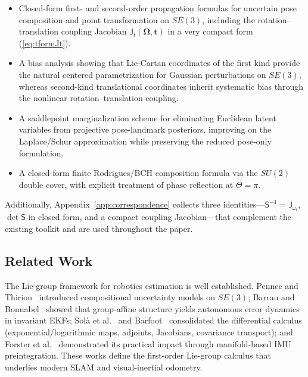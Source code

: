 \documentclass[journal]{IEEEtran}
\newcommand{\bfOmega}{\boldsymbol{\Omega}}
\begin{document}
\begin{itemize}
\item Closed-form first- and second-order propagation formulas
for uncertain pose composition and point transformation on
$SE(3)$, including the rotation--translation coupling Jacobian
$\mathsf{J}_t(\bfOmega,\mathbf{t})$ in a very compact
form (\ref{eq:tformJt}).
 
\item A bias analysis showing that Lie-Cartan coordinates of
the first kind provide the natural centered parametrization
for Gaussian perturbations on $SE(3)$, whereas second-kind
translational coordinates inherit systematic bias through
the nonlinear rotation--translation coupling.
 
\item A saddlepoint marginalization scheme for eliminating
Euclidean latent variables from projective pose-landmark
posteriors, improving on the Laplace/Schur approximation 
while preserving the reduced pose-only formulation.
 
\item A closed-form finite Rodrigues/BCH composition formula
via the $SU(2)$ double cover, with explicit treatment of
phase reflection at $\Theta=\pi$.
\end{itemize}
 
Additionally, Appendix~\ref{app:correspondence} collects three 
identities---$\mathsf{S}^{-1} = \mathsf{J}_{\omega_l}$, 
$\det\mathsf{S}$ in closed form, and a compact coupling 
Jacobian---that complement the existing toolkit and are used 
throughout the paper.

\subsection{Related Work}
 
The Lie-group framework for robotics estimation is well 
established. Pennec and Thirion~\cite{pennec97} introduced 
compositional uncertainty models on $SE(3)$; Barrau and 
Bonnabel~\cite{barrau2017invariant} showed that group-affine 
structure yields autonomous error dynamics in invariant EKFs; 
Sol\`a et al.~\cite{sola2018micro} and Barfoot~\cite{barfoot2024} 
consolidated the differential calculus (exponential/logarithmic 
maps, adjoints, Jacobians, covariance transport); and 
Forster et al.~\cite{forster2017manifold} demonstrated its 
practical impact through manifold-based IMU preintegration. 
These works define the first-order Lie-group calculus that 
underlies modern SLAM and visual-inertial odometry.
 
\end{document}
